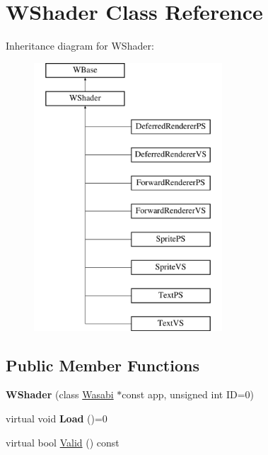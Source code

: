 \hypertarget{class_w_shader}{}\section{W\+Shader Class Reference}
\label{class_w_shader}
Inheritance diagram for W\+Shader\+:\begin{figure}[H]
\begin{center}
\leavevmode
\includegraphics[height=10.000000cm]{class_w_shader}
\end{center}
\end{figure}
\subsection*{Public Member Functions}
\begin{DoxyCompactItemize}
\item 
{\bfseries W\+Shader} (class \hyperlink{class_wasabi}{Wasabi} $\ast$const app, unsigned int ID=0)\hypertarget{class_w_shader_aa47ebd4f94586e3b030d16a549849568}{}\label{class_w_shader_aa47ebd4f94586e3b030d16a549849568}

\item 
virtual void {\bfseries Load} ()=0\hypertarget{class_w_shader_a7ce478193bc1676b1a7fdd741bdb32aa}{}\label{class_w_shader_a7ce478193bc1676b1a7fdd741bdb32aa}

\item 
virtual bool \hyperlink{class_w_shader_a04a739bdfc8524c6d5aa14353c0e3f99}{Valid} () const 
\end{DoxyCompactItemize}
